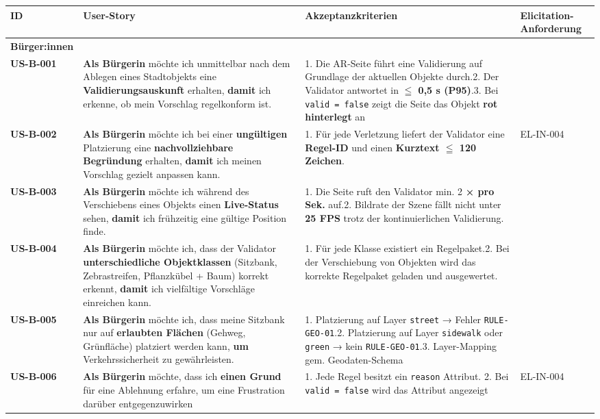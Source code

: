 
\bgroup
\def\arraystretch{1.5}
    \begin{longtable}{| p{} | p{} | p{} | p{} |} 
    \hline
    ID & User-Story & Akzeptanzkriterien & Elicitation-Anforderung \\
    \hline\hline
\textbf{Bürger:innen} &  &  \\
\hline
\textbf{US-B-001} & \textbf{Als Bürgerin} möchte ich unmittelbar nach dem Ablegen eines Stadtobjekts eine \textbf{Validierungsauskunft} erhalten, \textbf{damit} ich erkenne, ob mein Vorschlag regelkonform ist. & 1. Die AR-Seite führt eine Validierung auf Grundlage der aktuellen Objekte durch.2. Der Validator antwortet in \textbf{$\leqq$ 0,5 s (P95)}.3. Bei \verb|valid = false| zeigt die Seite das Objekt \textbf{rot hinterlegt} an & \\
\hline
\textbf{US-B-002} & \textbf{Als Bürgerin} möchte ich bei einer \textbf{ungültigen} Platzierung eine \textbf{nachvollziehbare Begründung} erhalten, \textbf{damit} ich meinen Vorschlag gezielt anpassen kann. & 1. Für jede Verletzung liefert der Validator eine \textbf{Regel-ID} und einen \textbf{Kurztext $\leqq$  120 Zeichen}. & EL-IN-004 \\
\hline
\textbf{US-B-003} & \textbf{Als Bürgerin} möchte ich während des Verschiebens eines Objekts einen \textbf{Live-Status} sehen, \textbf{damit} ich frühzeitig eine gültige Position finde. & 1. Die Seite ruft den Validator min. 2\textbf{ × pro Sek.} auf.2. Bildrate der Szene fällt nicht unter \textbf{25 FPS }trotz der kontinuierlichen Validierung. & \\
\hline
\textbf{US-B-004} & \textbf{Als Bürgerin} möchte ich, dass der Validator \textbf{unterschiedliche Objektklassen} (Sitzbank, Zebrastreifen, Pflanzkübel + Baum) korrekt erkennt, \textbf{damit} ich vielfältige Vorschläge einreichen kann. & 1. Für jede Klasse existiert ein Regelpaket.2. Bei der Verschiebung von Objekten wird das korrekte Regelpaket geladen und ausgewertet. & \\
\hline
\textbf{US-B-005} & \textbf{Als Bürgerin} möchte ich, dass meine Sitzbank nur auf \textbf{erlaubten Flächen} (Gehweg, Grünfläche) platziert werden kann, \textbf{um} Verkehrssicherheit zu gewährleisten. & 1. Platzierung auf Layer \verb|street| → Fehler \verb|RULE-GEO-01|.2. Platzierung auf Layer \verb|sidewalk| oder \verb|green| → kein \verb|RULE-GEO-01|.3. Layer-Mapping gem. Geodaten-Schema & \\
\hline
\textbf{US-B-006} & \textbf{Als Bürgerin} möchte, dass ich \textbf{einen Grund} für eine Ablehnung erfahre, um eine Frustration darüber entgegenzuwirken & 1. Jede Regel besitzt ein \verb|reason| Attribut. 2. Bei \verb|valid = false| wird das Attribut angezeigt & EL-IN-004\\

\end{longtable}

